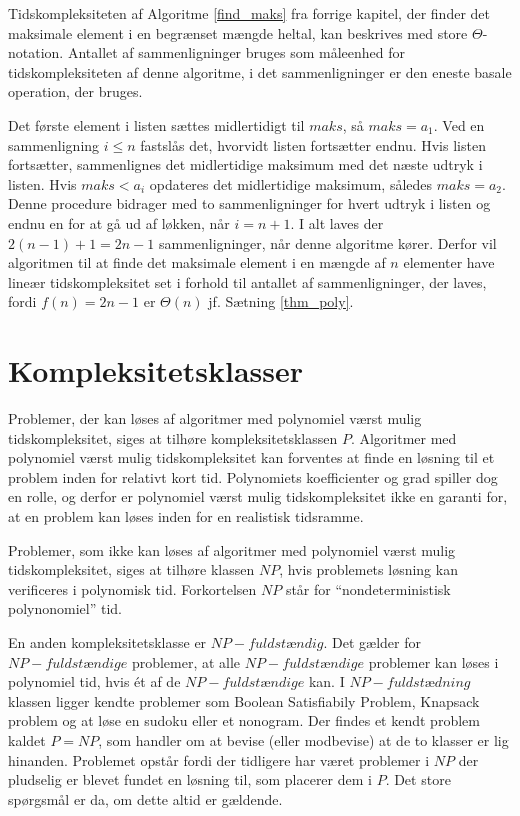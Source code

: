 \begin{exmp}
Tidskompleksiteten af Algoritme \ref{find_maks} fra forrige kapitel, der finder det maksimale element i en begrænset mængde heltal, kan beskrives med store $\Theta$-notation. 
Antallet af sammenligninger bruges som måleenhed for tidskompleksiteten af denne algoritme, i det sammenligninger er den eneste basale operation, der bruges.

Det første element i listen sættes midlertidigt til $maks$, så $maks=a_1$. 
Ved en sammenligning $i \leq n$ fastslås det, hvorvidt listen fortsætter endnu. Hvis listen fortsætter, sammenlignes det midlertidige maksimum med det næste udtryk i listen. 
Hvis $maks<a_i$ opdateres det midlertidige maksimum, således $maks=a_2$.
Denne procedure bidrager med to sammenligninger for hvert udtryk i listen og endnu en for at gå ud af løkken, når $i=n+1$. 
I alt laves der $2(n-1)+1=2n-1$ sammenligninger, når denne algoritme kører. 
Derfor vil algoritmen til at finde det maksimale element i en mængde af $n$ elementer have lineær tidskompleksitet set i forhold til antallet af sammenligninger, der laves, fordi $f(n)=2n-1$ er $\Theta (n)$ jf. Sætning \ref{thm_poly}. 
\label{eks_lin_soeg} 
\end{exmp}

\section{Kompleksitetsklasser}
Problemer, der kan løses af algoritmer med polynomiel værst mulig tidskompleksitet, siges at tilhøre kompleksitetsklassen $P$. 
Algoritmer med polynomiel værst mulig tidskompleksitet kan forventes at finde en løsning til et problem inden for relativt kort tid. 
Polynomiets koefficienter og grad spiller dog en rolle, og derfor er polynomiel værst mulig tidskompleksitet ikke en garanti for, at en problem kan løses inden for en realistisk tidsramme.

Problemer, som ikke kan løses af algoritmer med  polynomiel værst mulig tidskompleksitet, siges at tilhøre klassen $NP$, hvis problemets løsning kan verificeres i polynomisk tid. Forkortelsen $NP$ står for “nondeterministisk polynonomiel” tid. 

En anden kompleksitetsklasse er $NP-fuldstændig$.
Det gælder for $NP-fuldstændige$ problemer, at alle $NP-fuldstændige$ problemer kan løses i polynomiel tid, hvis ét af de $NP-fuldstændige$ kan.
I $NP-fuldstædning$ klassen ligger kendte problemer som Boolean Satisfiabily Problem, Knapsack problem og at løse en sudoku eller et nonogram.
Der findes et kendt problem kaldet $P=NP$, som handler om at bevise (eller modbevise) at de to klasser er lig hinanden.
Problemet opstår fordi der tidligere har været problemer i $NP$ der pludselig er blevet fundet en løsning til, som placerer dem i $P$.
Det store spørgsmål er da, om dette altid er gældende.
